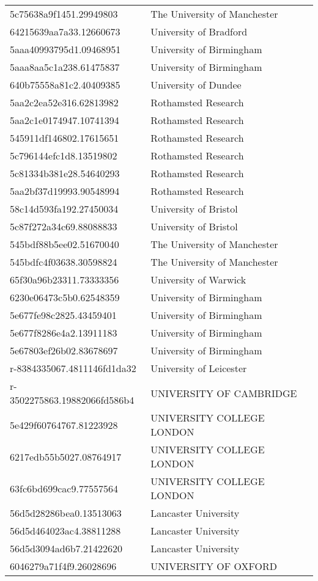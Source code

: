 \begin{tabular}{ll}
5c75638a9f1451.29949803 & The University of Manchester \\
64215639aa7a33.12660673 & University of Bradford \\
5aaa40993795d1.09468951 & University of Birmingham \\
5aaa8aa5c1a238.61475837 & University of Birmingham \\
640b75558a81c2.40409385 & University of Dundee \\
5aa2c2ea52e316.62813982 & Rothamsted Research \\
5aa2c1e0174947.10741394 & Rothamsted Research \\
545911df146802.17615651 & Rothamsted Research \\
5c796144efc1d8.13519802 & Rothamsted Research \\
5c81334b381e28.54640293 & Rothamsted Research \\
5aa2bf37d19993.90548994 & Rothamsted Research \\
58c14d593fa192.27450034 & University of Bristol \\
5c87f272a34c69.88088833 & University of Bristol \\
545bdf88b5ee02.51670040 & The University of Manchester \\
545bdfc4f03638.30598824 & The University of Manchester \\
65f30a96b23311.73333356 & University of Warwick \\
6230e06473c5b0.62548359 & University of Birmingham \\
5e677fe98c2825.43459401 & University of Birmingham \\
5e677f8286e4a2.13911183 & University of Birmingham \\
5e67803ef26b02.83678697 & University of Birmingham \\
r-8384335067.4811146fd1da32 & University of Leicester \\
r-3502275863.19882066fd586b4 & UNIVERSITY OF CAMBRIDGE \\
5e429f60764767.81223928 & UNIVERSITY COLLEGE LONDON \\
6217edb55b5027.08764917 & UNIVERSITY COLLEGE LONDON \\
63fc6bd699cac9.77557564 & UNIVERSITY COLLEGE LONDON \\
56d5d28286bea0.13513063 & Lancaster University \\
56d5d464023ac4.38811288 & Lancaster University \\
56d5d3094ad6b7.21422620 & Lancaster University \\
6046279a71f4f9.26028696 & UNIVERSITY OF OXFORD \\

\end{tabular}
